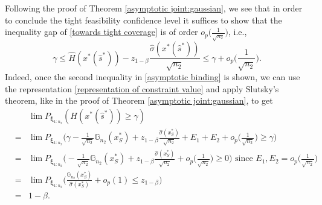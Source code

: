 \documentclass[mnsc,blindrev]{informs4} %
\begin{document}
Following the proof of Theorem \ref{asymptotic joint:gaussian}, we see that in order to conclude the tight feasibility confidence level it suffices to show that the inequality gap of \eqref{towards tight coverage} is of order $o_p\big(\frac{1}{\sqrt{n_2}}\big)$, i.e.,
\begin{equation}\label{asymptotic binding}
\gamma\leq\hat H(x^*(\hat s^*))-z_{1-\beta}\frac{\hat \sigma(x^*(\hat s^*))}{\sqrt{n_2}}\leq \gamma+o_p\big(\frac{1}{\sqrt{n_2}}\big).
\end{equation}
Indeed, once the second inequality in \eqref{asymptotic binding} is shown, we can use the representation \eqref{representation of constraint value} and apply Slutsky's theorem, like in the proof of Theorem \ref{asymptotic joint:gaussian}, to get
\begin{eqnarray*}
&&\lim P_{\bm{\xi}_{1:n_2}}(H(x^*(\hat s^*))\geq \gamma)\\
&= &\lim P_{\bm{\xi}_{1:n_2}}\Big(\gamma-\frac{1}{\sqrt{n_2}}\mathbb G_{n_2}(x_S^*)+z_{1-\beta}\frac{\hat \sigma (x_S^*)}{\sqrt{n_2}}+E_1+E_2+o_p\big(\frac{1}{\sqrt{n_2}}\big)\geq \gamma\Big)\\
&= &\lim P_{\bm{\xi}_{1:n_2}}\Big(-\frac{1}{\sqrt{n_2}}\mathbb G_{n_2}(x_S^*)+z_{1-\beta}\frac{\hat \sigma (x_S^*)}{\sqrt{n_2}}+o_p\big(\frac{1}{\sqrt{n_2}}\big)\geq 0\Big)\text{\ \ since }E_1,E_2=o_p\big(\frac{1}{\sqrt{n_2}}\big)\\
&= &\lim P_{\bm{\xi}_{1:n_2}}\Big(\frac{\mathbb G_{n_2}(x_S^*)}{\hat \sigma (x_S^*)}+o_p(1)\leq z_{1-\beta}\Big)\\
&=&1-\beta.
\end{eqnarray*}
\end{document}
